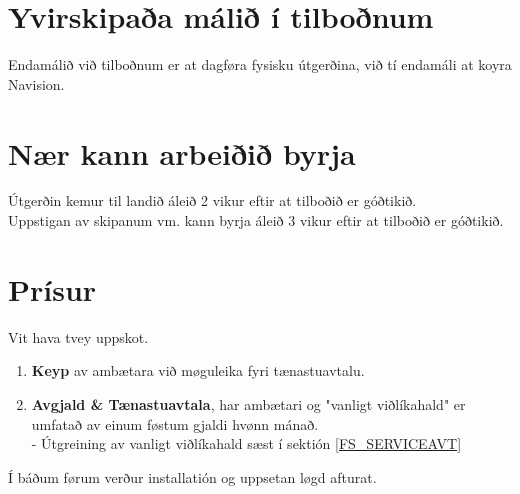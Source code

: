 \section{Yvirskipaða málið í tilboðnum}
Endamálið við tilboðnum er at dagføra fysisku útgerðina, við tí endamáli at koyra Navision.

\section{Nær kann arbeiðið byrja}
Útgerðin kemur til landið áleið 2 vikur eftir at tilboðið er góðtikið. \\
Uppstigan av skipanum vm. kann byrja áleið 3 vikur eftir at tilboðið er góðtikið. \\

\section{Prísur}
Vit hava tvey uppskot.
\begin{enumerate}
	\item \textbf{Keyp} av ambætara við møguleika fyri tænastuavtalu.
	\item \textbf{Avgjald \& Tænastuavtala}, har ambætari og "vanligt viðlíkahald" er umfatað av einum føstum gjaldi hvønn mánað. \\
	- Útgreining av vanligt viðlíkahald sæst í sektión \ref*{FS_SERVICEAVT}
\end{enumerate}
Í báðum førum verður installatión og uppsetan løgd afturat. \vspace*{6mm}

